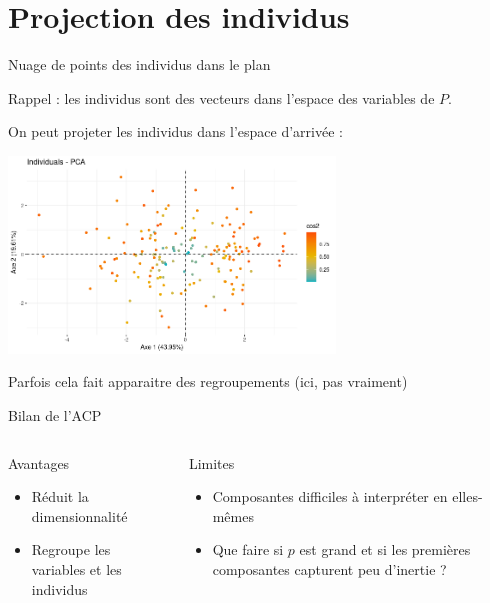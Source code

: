 \documentclass{beamer}
\begin{document}
\section{Projection des individus}


\begin{frame}{Nuage de points des individus dans le plan}

Rappel : les individus sont des vecteurs dans l'espace des variables de $P$. 

On peut projeter les individus dans l'espace d'arrivée : 

\begin{center}
\includegraphics[width=0.65\textwidth,keepaspectratio]{img/cercle_trigo_ACP_ind.png}
\end{center}
\begin{spacing}{0.7}
Parfois cela fait apparaitre des regroupements (ici, pas vraiment) 
\end{spacing}

\end{frame}






\begin{frame}{Bilan de l'ACP}


  \begin{columns}[T,onlytextwidth]
        \begin{alertblock}{Avantages}
        	\begin{itemize}
        		\item Réduit la dimensionnalité
        		\item Regroupe les variables et les individus 
        	\end{itemize}
      	\end{alertblock}

    
      \begin{block}{Limites}
        \begin{itemize}
            \item Composantes difficiles à interpréter en elles-mêmes
            \item Que faire si $p$ est grand et si les premières composantes capturent peu d'inertie ?
          \end{itemize}
      \end{block}

      
  \end{columns}
\end{frame}
\end{document}
